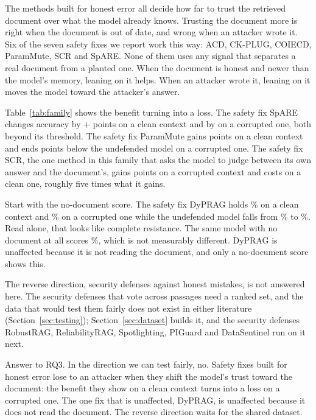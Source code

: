 The methods built for honest error all decide how far
to trust the retrieved document over what the model already knows. Trusting
the document more is right when the document is out of date, and wrong when an
attacker wrote it. Six of the seven safety fixes we report work this
way: ACD, CK-PLUG, COIECD, ParamMute, SCR and SpARE.
None of them uses any signal that separates a real document from a planted
one. When the document is honest and newer than the model's memory, leaning
on it helps. When an attacker wrote it, leaning on it moves the model toward
the attacker's answer.

Table~\ref{tab:family} shows the benefit turning into a loss. The safety fix SpARE changes accuracy by
+\ESpareClean{} points on a clean context and by \ESpareSat{} on a corrupted
one, both beyond its threshold. The safety fix ParamMute gains \EParamClean{} points on a clean context
and ends \EParamSatGap{} points below the undefended model on a corrupted one.
The safety fix SCR, the one method in this family that asks the
model to judge between its own answer and the document's, gains
\EScrSatGain{} points on a corrupted context and costs \EScrCleanCost{} on a
clean one, roughly five times what it gains.

Start with the no-document score. The safety fix DyPRAG holds \EDypragClean\% on a clean
context and \EDypragSat\% on a corrupted one while the undefended model falls
from \EDypragRagClean\% to \EDypragRagSat\%. Read alone, that looks like
complete resistance. The same model with no document at all scores
\EDypragNoRet\%, which is not measurably different. DyPRAG is unaffected
because it is not reading the document, and only a no-document score shows
this.

The reverse direction, security defenses against honest mistakes, is not
answered here. The security defenses that vote across passages need a ranked
set, and the data that would test them fairly does not exist in either
literature (Section~\ref{sec:testing}); Section~\ref{sec:dataset} builds it,
and the security defenses RobustRAG, ReliabilityRAG, Spotlighting, PIGuard and
DataSentinel run on it next.

Answer to RQ3. In the direction we can test fairly, no. Safety fixes built
for honest error lose to an attacker when they shift the model's trust toward
the document: the benefit they show on a clean context turns into a loss on
a corrupted one. The one fix that is unaffected, DyPRAG, is unaffected
because it does not read the document. The reverse direction waits for the
shared dataset.

